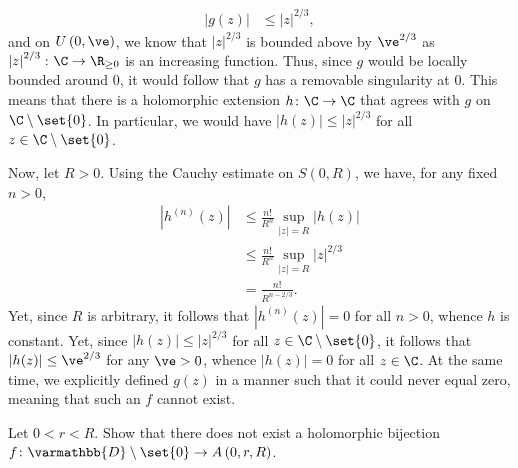 \documentclass[11pt]{mypackage}
\renewcommand*{\mathbb}[1]{\varmathbb{#1}}
\begin{document}
\begin{solution}
\begin{enumerate}[(a)]
      \begin{align*}
        \left\vert g(z) \right\vert &\leq \left\vert z \right\vert^{2/3},
      \end{align*}
      and on $U\left( 0,\ve \right)$, we know that $\left\vert z \right\vert^{2/3}$ is bounded above by $\ve^{2/3}$ as $\left\vert z \right\vert^{2/3}\colon \C\rightarrow \R_{\geq 0}$ is an increasing function. Thus, since $g$ would be locally bounded around $0$, it would follow that $g$ has a removable singularity at $0$. This means that there is a holomorphic extension $h\colon \C\rightarrow \C$ that agrees with $g$ on $\C\setminus \set{0}$. In particular, we would have $\left\vert h(z) \right\vert \leq \left\vert z \right\vert^{2/3}$ for all $z\in \C\setminus\set{0}$.\newline

      Now, let $R > 0$. Using the Cauchy estimate on $S\left( 0,R \right)$, we have, for any fixed $n > 0$,
      \begin{align*}
        \left\vert h^{(n)}(z) \right\vert &\leq \frac{n!}{R^{n}} \sup_{\left\vert z \right\vert = R} \left\vert h(z) \right\vert\\
                                          &\leq \frac{n!}{R^{n}} \sup_{\left\vert z \right\vert = R} \left\vert z \right\vert^{2/3}\\
                                          &= \frac{n!}{R^{n-2/3}}.
      \end{align*}
      Yet, since $R$ is arbitrary, it follows that $\left\vert h^{(n)}(z) \right\vert = 0$ for all $n > 0$, whence $h$ is constant. Yet, since $\left\vert h(z) \right\vert \leq \left\vert z \right\vert^{2/3}$ for all $z \in \C\setminus \set{0}$, it follows that $\left\vert h(z) \right\vert \leq \ve^{2/3}$ for any $\ve > 0$, whence $\left\vert h(z) \right\vert = 0$ for all $z\in \C$. At the same time, we explicitly defined $g(z)$ in a manner such that it could never equal zero, meaning that such an $f$ cannot exist.
  \end{enumerate}
\end{solution}
\begin{problem}[Problem 3]
  Let $0 < r < R$. Show that there does not exist a holomorphic bijection $f\colon \mathbb{D}\setminus \set{0}\rightarrow A\left( 0,r,R \right)$.
\end{problem}
\end{document}
